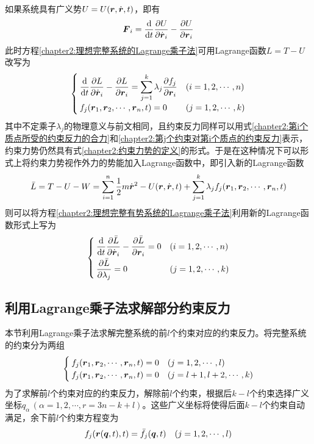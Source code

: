 如果系统具有广义势$U=U(\boldsymbol{r},\dot{\boldsymbol{r}},t)$，即有
\begin{equation}
	\boldsymbol{F}_i = \frac{\mathrm{d}}{\mathrm{d} t} \frac{\partial U}{\partial \dot{\boldsymbol{r}}_i} - \frac{\partial U}{\partial \boldsymbol{r}_i}
\end{equation}
此时方程\eqref{chapter2:理想完整系统的Lagrange乘子法}可用Lagrange函数$L=T-U$改写为
\begin{equation}
\begin{cases}
	\displaystyle \frac{\mathrm{d}}{\mathrm{d} t} \frac{\partial L}{\partial \dot{\boldsymbol{r}}_i} - \frac{\partial L}{\partial \boldsymbol{r}_i} = \sum_{j=1}^k \lambda_j \frac{\partial f_j}{\partial \boldsymbol{r}_i} & (i = 1,2,\cdots,n) \\
	\displaystyle f_j(\boldsymbol{r}_1,\boldsymbol{r}_2,\cdots,\boldsymbol{r}_n,t) = 0 & (j=1,2,\cdots,k)
\end{cases}
\label{chapter2:理想完整有势系统的Lagrange乘子法}
\end{equation}
其中不定乘子$\lambda_j$的物理意义与前文相同，且约束反力同样可以用式\eqref{chapter2:第i个质点所受的约束反力的合力}和\eqref{chapter2:第j个约束对第i个质点的约束反力}表示，约束力势仍然具有式\eqref{chapter2:约束力势的定义}的形式。于是在这种情况下可以形式上将约束力势视作外力的势能加入Lagrange函数中，即引入新的Lagrange函数
\begin{equation}
	\bar{L} = T-U-W = \sum_{i=1}^n \frac12 m\dot{\boldsymbol{r}}^2 - U(\boldsymbol{r},\dot{\boldsymbol{r}},t) + \sum_{j=1}^k \lambda_j f_j(\boldsymbol{r}_1,\boldsymbol{r}_2,\cdots,\boldsymbol{r}_n,t)
\end{equation}
则可以将方程\eqref{chapter2:理想完整有势系统的Lagrange乘子法}利用新的Lagrange函数形式上写为
\begin{equation}
\begin{cases}
	\displaystyle \frac{\mathrm{d}}{\mathrm{d} t} \frac{\partial \bar{L}}{\partial \dot{\boldsymbol{r}}_i} - \frac{\partial \bar{L}}{\partial \boldsymbol{r}_i} = 0 & (i=1,2,\cdots,n) \\[1.5ex]
	\displaystyle \frac{\partial \bar{L}}{\partial \lambda_j} = 0 & (j = 1,2,\cdots,k)
\end{cases}
\end{equation}

\subsection{利用Lagrange乘子法求解部分约束反力}

本节利用Lagrange乘子法求解完整系统的前$l$个约束对应的约束反力。将完整系统的约束分为两组
\begin{equation*}
\begin{cases}
	f_j(\boldsymbol{r}_1,\boldsymbol{r}_2,\cdots,\boldsymbol{r}_n,t) = 0 & (j = 1,2,\cdots,l) \\
	f_j(\boldsymbol{r}_1,\boldsymbol{r}_2,\cdots,\boldsymbol{r}_n,t) = 0 & (j = l+1,l+2,\cdots,k)
\end{cases}
\end{equation*}
为了求解前$l$个约束对应的约束反力，解除前$l$个约束，根据后$k-l$个约束选择广义坐标$q_\alpha\,(\alpha=1,2,\cdots,r = 3n-k+l)$。这些广义坐标将使得后面$k-l$个约束自动满足，余下前$l$个约束方程变为
\begin{equation}
	f_j(\boldsymbol{r}(\boldsymbol{q},t),t) = \bar{f}_j(\boldsymbol{q},t) \quad (j=1,2,\cdots,l)
	\label{chapter2:解除部分约束后余下的约束方程}
\end{equation}

